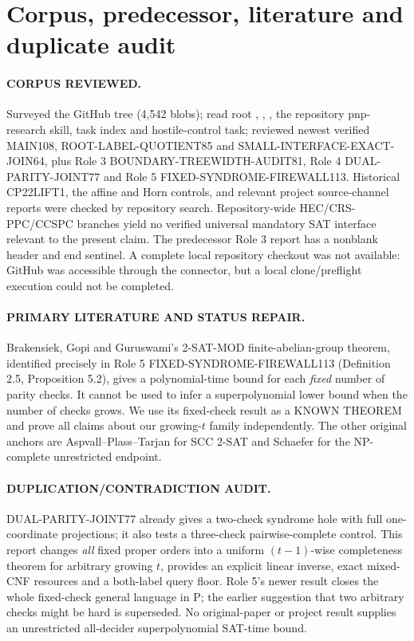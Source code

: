 \documentclass[11pt]{article}
\begin{document}
\section{Corpus, predecessor, literature and duplicate audit}
\paragraph{CORPUS REVIEWED.} Surveyed the GitHub tree (4,542 blobs); read root , , , the repository pnp-research skill, task index and hostile-control task; reviewed newest verified MAIN108, ROOT-LABEL-QUOTIENT85 and SMALL-INTERFACE-EXACT-JOIN64, plus Role 3 BOUNDARY-TREEWIDTH-AUDIT81, Role 4 DUAL-PARITY-JOINT77 and Role 5 FIXED-SYNDROME-FIREWALL113. Historical CP22LIFT1, the affine and Horn controls, and relevant project source-channel reports were checked by repository search. Repository-wide HEC/CRS-PPC/CCSPC branches yield no verified universal mandatory SAT interface relevant to the present claim. The predecessor Role 3 report has a nonblank header and end sentinel. A complete local repository checkout was not available: GitHub was accessible through the connector, but a local clone/preflight execution could not be completed.

\paragraph{PRIMARY LITERATURE AND STATUS REPAIR.} Brakensiek, Gopi and Guruswami's 2-SAT-MOD finite-abelian-group theorem, identified precisely in Role 5 FIXED-SYNDROME-FIREWALL113 (Definition 2.5, Proposition 5.2), gives a polynomial-time bound for each \emph{fixed} number of parity checks. It cannot be used to infer a superpolynomial lower bound when the number of checks grows. We use its fixed-check result as a KNOWN THEOREM and prove all claims about our growing-\(t\) family independently. The other original anchors are Aspvall--Plass--Tarjan for SCC 2-SAT and Schaefer for the NP-complete unrestricted endpoint.

\paragraph{DUPLICATION/CONTRADICTION AUDIT.} DUAL-PARITY-JOINT77 already gives a two-check syndrome hole with full one-coordinate projections; it also tests a three-check pairwise-complete control. This report changes \emph{all} fixed proper orders into a uniform \((t-1)\)-wise completeness theorem for arbitrary growing \(t\), provides an explicit linear inverse, exact mixed-CNF resources and a both-label query floor. Role 5's newer result closes the whole fixed-check general language in P; the earlier suggestion that two arbitrary checks might be hard is superseded. No original-paper or project result supplies an unrestricted all-decider superpolynomial SAT-time bound.
\end{document}
